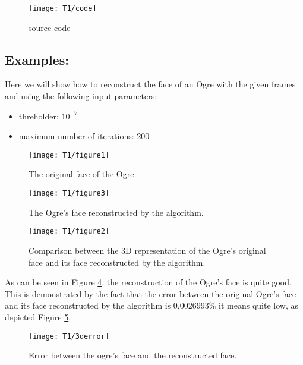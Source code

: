 \begin{figure}[h]
    \centering
    \texttt{[image: T1/code]}
    \caption{source code}
    \label{fig:codeT1}
\end{figure}

\subsection{Examples:}
\noindent Here we will show how to reconstruct the face of an Ogre with the given frames and using the following input parameters:

\begin{itemize}
\item threholder: $10^{-7}$
\item maximum number of iterations: 200
\end{itemize}

\begin{figure}[h]
    \centering
    \texttt{[image: T1/figure1]}
    \caption{The original face of the Ogre.}
    \label{fig:real_ogre}
\end{figure}

\begin{figure}[h]
    \centering
    \texttt{[image: T1/figure3]}
    \caption{The Ogre's face reconstructed by the algorithm.}
    \label{fig:ogre}
\end{figure}

\begin{figure}[h!]
    \centering
    \texttt{[image: T1/figure2]}
    \caption{Comparison between the 3D representation of the Ogre's original face and its face reconstructed by the algorithm.}
    \label{fig:real_ogre_vs_ogre}
\end{figure}
\noindent As can be seen in Figure \ref{fig:real_ogre_vs_ogre}, the reconstruction of the Ogre's face is quite good. This is demonstrated by the fact that the error between the original Ogre's face and its face reconstructed by the algorithm is 0,0026993\% it means quite low, as depicted Figure \ref{fig:3d_error}.

\begin{figure}[h!]
    \centering
    \texttt{[image: T1/3derror]}
    \caption{Error between the ogre's face and the reconstructed face.}
    \label{fig:3d_error}
\end{figure}
